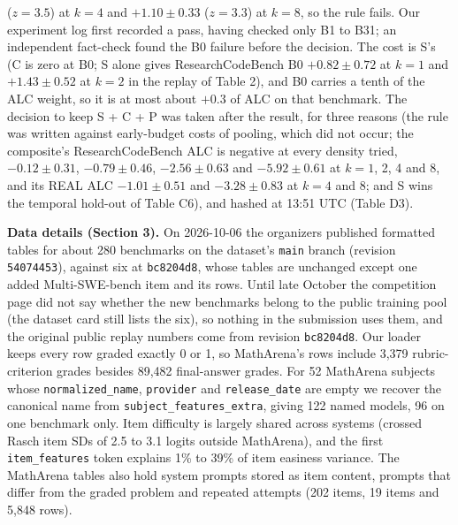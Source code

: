 \documentclass[
]{article}
\begin{document}
(\(z = 3.5\)) at \(k = 4\) and \(+1.10 \pm 0.33\) (\(z = 3.3\)) at
\(k = 8\), so the rule fails. Our experiment log first recorded a pass,
having checked only B1 to B31; an independent fact-check found the B0
failure before the decision. The cost is S's (C is zero at B0; S alone
gives ResearchCodeBench B0 \(+0.82 \pm 0.72\) at \(k = 1\) and
\(+1.43 \pm 0.52\) at \(k = 2\) in the replay of Table 2), and B0
carries a tenth of the ALC weight, so it is at most about \(+0.3\) of
ALC on that benchmark. The decision to keep S + C + P was taken after
the result, for three reasons (the rule was written against early-budget
costs of pooling, which did not occur; the composite's ResearchCodeBench
ALC is negative at every density tried, \(-0.12 \pm 0.31\),
\(-0.79 \pm 0.46\), \(-2.56 \pm 0.63\) and \(-5.92 \pm 0.61\) at
\(k = 1\), 2, 4 and 8, and its REAL ALC \(-1.01 \pm 0.51\) and
\(-3.28 \pm 0.83\) at \(k = 4\) and 8; and S wins the temporal hold-out
of Table C6), and hashed at 13:51 UTC (Table D3).

\textbf{Data details (Section 3).} On 2026-10-06 the organizers
published formatted tables for about 280 benchmarks on the dataset's
\texttt{main} branch (revision \texttt{54074453}), against six at
\texttt{bc8204d8}, whose tables are unchanged except one added
Multi-SWE-bench item and its rows. Until late October the competition
page did not say whether the new benchmarks belong to the public
training pool (the dataset card still lists the six), so nothing in the
submission uses them, and the original public replay numbers come from
revision \texttt{bc8204d8}. Our loader keeps every row graded exactly 0
or 1, so MathArena's rows include 3,379 rubric-criterion grades besides
89,482 final-answer grades. For 52 MathArena subjects whose
\texttt{normalized\_name}, \texttt{provider} and \texttt{release\_date}
are empty we recover the canonical name from
\texttt{subject\_features\_extra}, giving 122 named models, 96 on one
benchmark only. Item difficulty is largely shared across systems
(crossed Rasch item SDs of 2.5 to 3.1 logits outside MathArena), and the
first \texttt{item\_features} token explains 1\% to 39\% of item
easiness variance. The MathArena tables also hold system prompts stored
as item content, prompts that differ from the graded problem and
repeated attempts (202 items, 19 items and 5,848 rows).
\end{document}
